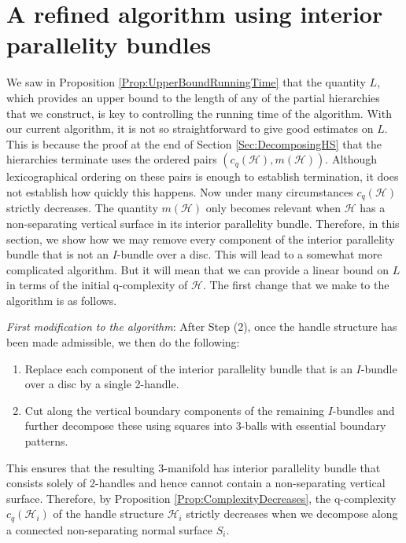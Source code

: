 \documentclass[oneside]{amsart}
\numberwithin{equation}{section}
\theoremstyle{plain}
\theoremstyle{definition}
\newcommand{\calH}{\mathcal{H}}
\begin{document}
\section{A refined algorithm using interior parallelity bundles}
\label{Sec:AlgorithmParallelity}

We saw in Proposition \ref{Prop:UpperBoundRunningTime} that the quantity $L$, which provides an upper bound to the length of any of the partial hierarchies that we construct, is key to controlling the running time of the algorithm. With our current algorithm, it is not so straightforward to give good estimates on $L$. This is because the proof at the end of Section \ref{Sec:DecomposingHS} that the hierarchies terminate uses the ordered pairs $(c_q(\mathcal{H}), m(\mathcal{H}))$. Although lexicographical ordering on these pairs is enough to establish termination, it does not establish how quickly this happens. Now under many circumstances $c_q(\mathcal{H})$ strictly decreases. The quantity $m(\mathcal{H})$ only becomes relevant when $\mathcal{H}$ has a non-separating vertical surface in its interior parallelity bundle. Therefore, in this section, we show how we may remove every component of the interior parallelity bundle that is not an $I$-bundle over a disc. This will lead to a somewhat more complicated algorithm. 
But it will mean that we can provide a linear bound on $L$ in terms of the initial q-complexity of $\mathcal{H}$. The first change that we make to the algorithm is as follows.

\medskip
\noindent \emph{First modification to the algorithm}: After Step (2), once the handle structure has been made admissible, we then do the following:
\begin{enumerate}
\item[$(2')$] Replace each component of the interior parallelity bundle that is an $I$-bundle over a disc by a single 2-handle.
\item[$(2'')$] Cut along the vertical boundary components of the remaining $I$-bundles and further decompose these using squares into 3-balls with essential boundary patterns.
\end{enumerate}

This ensures that the resulting 3-manifold has interior parallelity bundle that consists solely of 2-handles and hence cannot contain a non-separating vertical surface. Therefore, by Proposition \ref{Prop:ComplexityDecreases}, the q-complexity $c_q(\calH_i)$ of the handle structure $\calH_i$ strictly decreases when we decompose along a connected non-separating normal surface $S_i$. 
\end{document}
